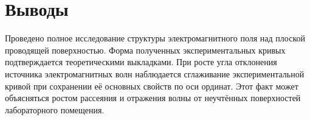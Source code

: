 \documentclass[11pt,a4paper,oneside, titlepage,reqno]{amsproc}
\begin{document}
\vspace{10pt}
\section{Выводы}
Проведено полное исследование структуры электромагнитного поля над плоской проводящей
поверхностью. Форма полученных экспериментальных кривых подтверждается
теоретическими выкладками. При росте угла отклонения источника электромагнитных
волн наблюдается сглаживание
экспериментальной кривой при сохранении её основных свойств по оси ординат. Этот факт может
объясняться ростом рассеяния и отражения волны от неучтённых поверхностей лабораторного
помещения.
\end{document}
